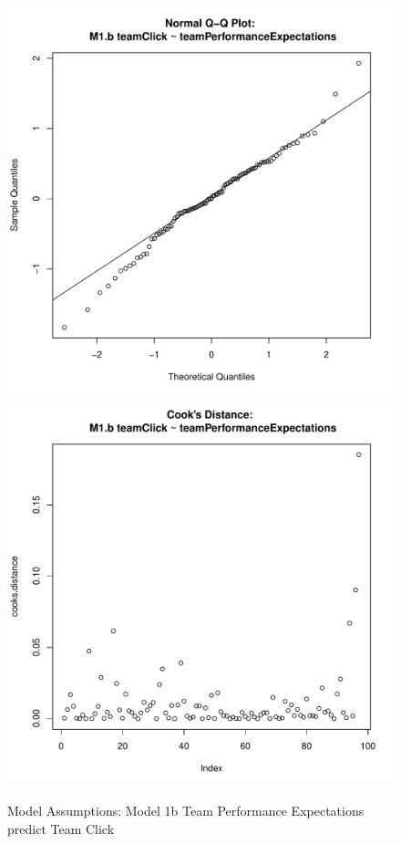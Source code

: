 \documentclass[12pt]{report}
\begin{document}
{\begin{figure}[htbp]
  \includegraphics[scale =.4]{../images/MLM1bQQNorm.pdf}
  \includegraphics[scale =.4]{../images/MLM1bCooksD.pdf}
  \caption{Model Assumptions: Model 1b Team Performance Expectations predict Team Click}
  \label{fig:MLM1bAssumptions}
\end{figure}








}
\end{document}

